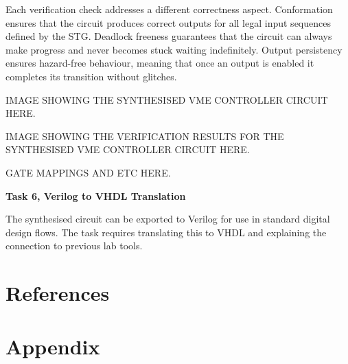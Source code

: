 \documentclass[a4paper,12pt]{article}
\begin{document}
Each verification check addresses a different correctness aspect. Conformation ensures that the circuit produces correct outputs for all legal input sequences defined by the STG. Deadlock freeness guarantees that the circuit can always make progress and never becomes stuck waiting indefinitely. Output persistency ensures hazard-free behaviour, meaning that once an output is enabled it completes its transition without glitches.

\begin{large}
    IMAGE SHOWING THE SYNTHESISED VME CONTROLLER CIRCUIT HERE.
\end{large}

\begin{large}
    IMAGE SHOWING THE VERIFICATION RESULTS FOR THE SYNTHESISED VME CONTROLLER CIRCUIT HERE.
\end{large}

\begin{large}
    GATE MAPPINGS AND ETC HERE.
\end{large}

\textbf{Task 6, Verilog to VHDL Translation}

The synthesised circuit can be exported to Verilog for use in standard digital design flows. 
The task requires translating this to VHDL and explaining the connection to previous lab tools.

\section{References}

\section{Appendix}
\end{document}
